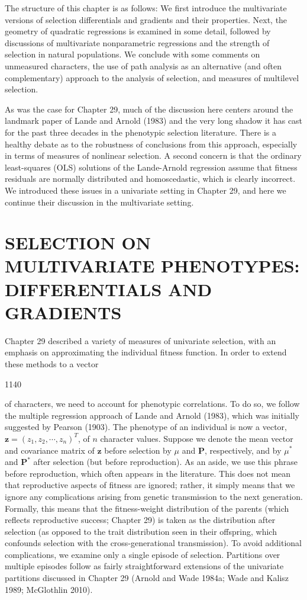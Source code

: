 \documentclass{article}
\begin{document}
The structure of this chapter is as follows: We first introduce the multivariate versions of selection differentials and gradients and their properties. Next, the geometry of quadratic regressions is examined in some detail, followed by discussions of multivariate nonparametric regressions and the strength of selection in natural populations. We conclude with some comments on unmeasured characters, the use of path analysis as an alternative (and often complementary) approach to the analysis of selection, and measures of multilevel selection.

As was the case for Chapter 29, much of the discussion here centers around the landmark paper of Lande and Arnold (1983) and the very long shadow it has cast for the past three decades in the phenotypic selection literature. There is a healthy debate as to the robustness of conclusions from this approach, especially in terms of measures of nonlinear selection. A second concern is that the ordinary least-squares (OLS) solutions of the Lande-Arnold regression assume that fitness residuals are normally distributed and homoscedastic, which is clearly incorrect. We introduced these issues in a univariate setting in Chapter 29, and here we continue their discussion in the multivariate setting.

\section{SELECTION ON MULTIVARIATE PHENOTYPES: DIFFERENTIALS AND GRADIENTS}
Chapter 29 described a variety of measures of univariate selection, with an emphasis on approximating the individual fitness function. In order to extend these methods to a vector

1140

of characters, we need to account for phenotypic correlations. To do so, we follow the multiple regression approach of Lande and Arnold (1983), which was initially suggested by Pearson (1903). The phenotype of an individual is now a vector,  $ \mathbf{z} = (z_1, z_2, \cdots, z_n)^T $, of  $ n $ character values. Suppose we denote the mean vector and covariance matrix of  $ \mathbf{z} $ before selection by  $ \mu $ and  $ \mathbf{P} $, respectively, and by  $ \mu^* $ and  $ \mathbf{P}^* $ after selection (but before reproduction). As an aside, we use this phrase before reproduction, which often appears in the literature. This does not mean that reproductive aspects of fitness are ignored; rather, it simply means that we ignore any complications arising from genetic transmission to the next generation. Formally, this means that the fitness-weight distribution of the parents (which reflects reproductive success; Chapter 29) is taken as the distribution after selection (as opposed to the trait distribution seen in their offspring, which confounds selection with the cross-generational transmission). To avoid additional complications, we examine only a single episode of selection. Partitions over multiple episodes follow as fairly straightforward extensions of the univariate partitions discussed in Chapter 29 (Arnold and Wade 1984a; Wade and Kalisz 1989; McGlothlin 2010).
\end{document}
